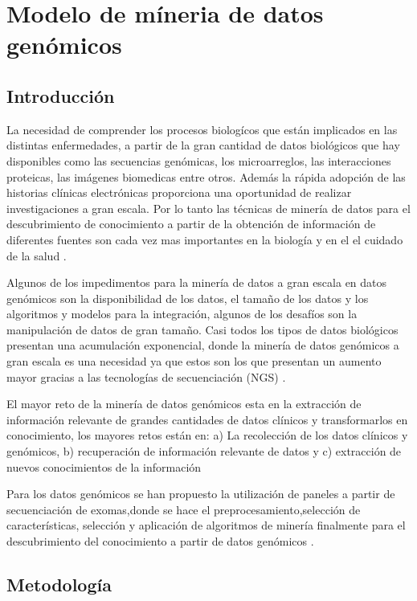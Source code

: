 \chapter{Modelo de míneria de datos genómicos}

\section{Introducción}

La necesidad de comprender los procesos biologícos que están implicados en las distintas enfermedades, a partir de la gran cantidad de datos biológicos que hay disponibles como las secuencias genómicas, los microarreglos, las interacciones proteicas, las imágenes biomedicas entre otros. Además la rápida adopción de las historias clínicas electrónicas proporciona una oportunidad de realizar investigaciones a gran escala. Por lo tanto las técnicas de minería de datos para el descubrimiento de conocimiento a partir de la obtención de información de diferentes fuentes son cada vez mas importantes en la biología y en el el cuidado de la salud \cite{Wang2017}.

Algunos de los impedimentos para la minería de datos a gran escala en datos genómicos son la disponibilidad de los datos, el tamaño de los datos y los algoritmos y modelos para la integración, algunos de los desafíos son la manipulación de datos de gran tamaño. Casi todos los tipos de datos biológicos presentan una acumulación exponencial, donde la minería de datos genómicos a gran escala es una necesidad ya que estos son los que presentan un aumento mayor gracias a las tecnologías de secuenciación (NGS) \cite{Huttenhower2010}.

El mayor reto de la minería de datos genómicos esta en la extracción de información relevante de grandes cantidades de datos clínicos y transformarlos en conocimiento, los mayores retos están en: a) La recolección de los datos clínicos y genómicos, b) recuperación de información relevante de datos y c) extracción de nuevos conocimientos de la información \cite{Farid2016}  

Para los datos genómicos se han propuesto la utilización de paneles a partir de secuenciación de exomas,donde se hace el preprocesamiento,selección de características, selección y aplicación de algoritmos de minería finalmente para el descubrimiento del conocimiento a partir de datos genómicos \cite{Farid2016}. 

\section{Metodología}

